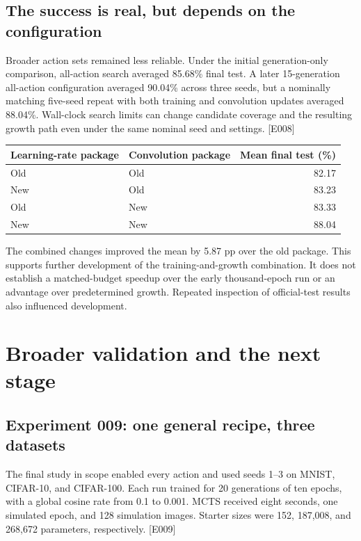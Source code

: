 \documentclass[11pt,a4paper]{article}
\newcommand{\ev}[1]{\textcolor{ink}{\small[#1]}}
\begin{document}
\subsection{The success is real, but depends on the configuration}
Broader action sets remained less reliable. Under the initial generation-only comparison, all-action search averaged 85.68\% final test. A later 15-generation all-action configuration averaged 90.04\% across three seeds, but a nominally matching five-seed repeat with both training and convolution updates averaged 88.04\%. Wall-clock search limits can change candidate coverage and the resulting growth path even under the same nominal seed and settings. \ev{E008}

\begin{center}
\begin{tabular}{llr}\toprule
Learning-rate package & Convolution package & Mean final test (\%)\\\midrule
Old & Old &82.17\\
New & Old &83.23\\
Old & New &83.33\\
New & New &88.04\\\bottomrule
\end{tabular}
\end{center}

The combined changes improved the mean by 5.87 pp over the old package. This supports further development of the training-and-growth combination. It does not establish a matched-budget speedup over the early thousand-epoch run or an advantage over predetermined growth. Repeated inspection of official-test results also influenced development.

\newpage
\section{Broader validation and the next stage}
\subsection{Experiment 009: one general recipe, three datasets}
The final study in scope enabled every action and used seeds 1--3 on MNIST, CIFAR-10, and CIFAR-100. Each run trained for 20 generations of ten epochs, with a global cosine rate from 0.1 to 0.001. MCTS received eight seconds, one simulated epoch, and 128 simulation images. Starter sizes were 152, 187,008, and 268,672 parameters, respectively. \ev{E009}
\end{document}
